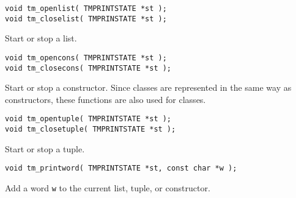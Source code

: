 \begin{verbatim}
void tm_openlist( TMPRINTSTATE *st );
void tm_closelist( TMPRINSTATE *st );
\end{verbatim}
\begin{desc}
Start or stop a list.
\end{desc}
\begin{verbatim}
void tm_opencons( TMPRINTSTATE *st );
void tm_closecons( TMPRINTSTATE *st );
\end{verbatim}
\begin{desc}
Start or stop a constructor. Since classes are represented in the
same way as constructors, these functions are also used for classes.
\end{desc}
\begin{verbatim}
void tm_opentuple( TMPRINTSTATE *st );
void tm_closetuple( TMPRINTSTATE *st );
\end{verbatim}
\begin{desc}
Start or stop a tuple.
\end{desc}
\begin{verbatim}
void tm_printword( TMPRINTSTATE *st, const char *w );
\end{verbatim}
\begin{desc}
Add a word \texttt{w} to the current list, tuple, or constructor.
\end{desc}
